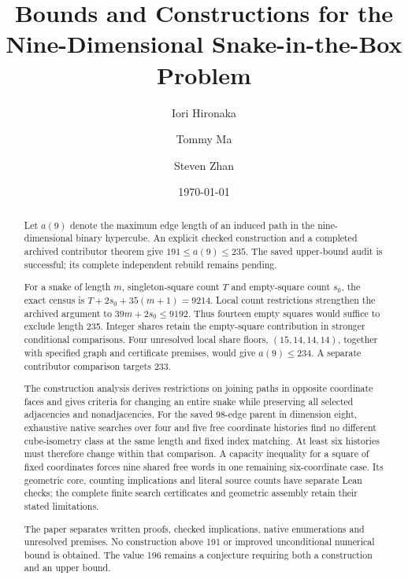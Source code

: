 \documentclass[11pt,a4paper]{article}
\title{Bounds and Constructions for the\\
Nine-Dimensional Snake-in-the-Box Problem}
\author{Iori Hironaka \and Tommy Ma \and Steven Zhan}
\date{\today}
\theoremstyle{definition}
\theoremstyle{remark}
\begin{document}
\maketitle
\begin{abstract}
Let $a(9)$ denote the maximum edge length of an induced path in the
nine-dimensional binary hypercube. An explicit checked construction and
a completed archived contributor theorem give $191\le a(9)\le235$.
The saved upper-bound audit is successful; its complete independent
rebuild remains pending.

For a snake of length $m$, singleton-square count $T$ and empty-square
count $s_0$, the exact census is $T+2s_0+35(m+1)=9214$.
Local count restrictions strengthen the archived argument to
$39m+2s_0\le9192$. Thus fourteen empty squares would suffice to exclude
length 235. Integer shares retain the empty-square contribution in
stronger conditional comparisons. Four unresolved local share floors,
$(15,14,14,14)$, together with specified graph and certificate premises,
would give $a(9)\le234$. A separate contributor comparison targets 233.

The construction analysis derives restrictions on joining paths in
opposite coordinate faces and gives criteria for changing an entire
snake while preserving all selected adjacencies and nonadjacencies.
For the saved 98-edge parent in dimension eight, exhaustive native
searches over four and five free coordinate histories find no different
cube-isometry class at the same length and fixed index matching.
At least six histories must therefore change within that comparison.
A capacity inequality for a square of fixed coordinates forces nine
shared free words in one remaining six-coordinate case. Its geometric
core, counting implications and literal source counts have separate
Lean checks; the complete finite search certificates and geometric
assembly retain their stated limitations.

The paper separates written proofs, checked implications, native
enumerations and unresolved premises. No construction above 191 or
improved unconditional numerical bound is obtained. The value 196
remains a conjecture requiring both a construction and an upper bound.
\end{abstract}

\clearpage
\setcounter{tocdepth}{1}
\tableofcontents
\clearpage
\end{document}
